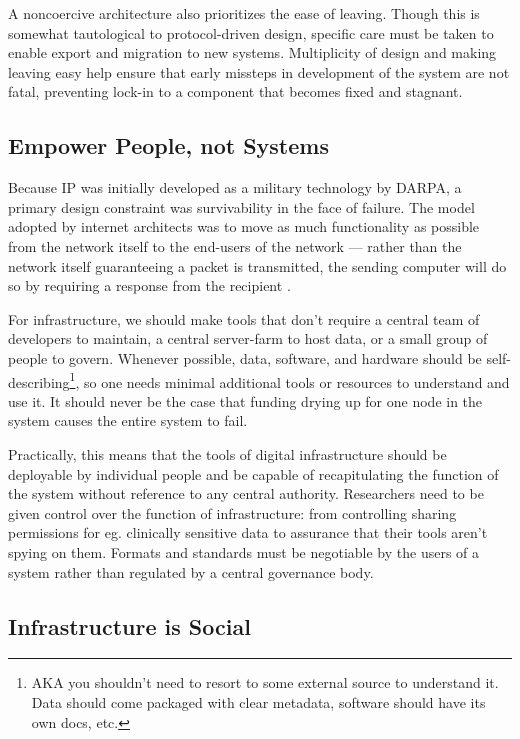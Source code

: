 A noncoercive architecture also prioritizes the ease of leaving. Though
this is somewhat tautological to protocol-driven design, specific care
must be taken to enable export and migration to new systems.
Multiplicity of design and making leaving easy help ensure that early
missteps in development of the system are not fatal, preventing lock-in
to a component that becomes fixed and stagnant.

\hypertarget{empower-people-not-systems}{%
\subsection{Empower People, not
Systems}\label{empower-people-not-systems}}

Because IP was initially developed as a military technology by DARPA, a
primary design constraint was survivability in the face of failure. The
model adopted by internet architects was to move as much functionality
as possible from the network itself to the end-users of the network ---
rather than the network itself guaranteeing a packet is transmitted, the
sending computer will do so by requiring a response from the recipient
\citep{clarkDesignPhilosophyDARPA1988} .

For infrastructure, we should make tools that don't require a central
team of developers to maintain, a central server-farm to host data, or a
small group of people to govern. Whenever possible, data, software, and
hardware should be self-describing\footnote{AKA you shouldn't need to
  resort to some external source to understand it. Data should come
  packaged with clear metadata, software should have its own docs, etc.},
so one needs minimal additional tools or resources to understand and use
it. It should never be the case that funding drying up for one node in
the system causes the entire system to fail.

Practically, this means that the tools of digital infrastructure should
be deployable by individual people and be capable of recapitulating the
function of the system without reference to any central authority.
Researchers need to be given control over the function of
infrastructure: from controlling sharing permissions for eg. clinically
sensitive data to assurance that their tools aren't spying on them.
Formats and standards must be negotiable by the users of a system rather
than regulated by a central governance body.

\hypertarget{infrastructure-is-social}{%
\subsection{Infrastructure is Social}\label{infrastructure-is-social}}


